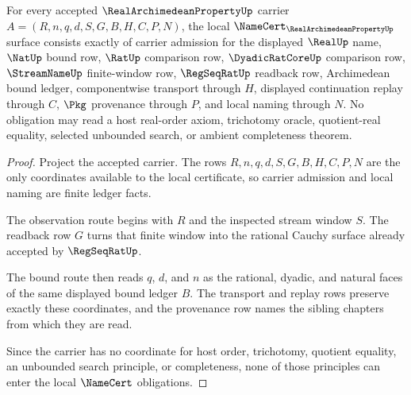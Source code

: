\begin{theorem}
\label{thm:real-archimedean-property-namecert-obligations}
For every accepted $\RealArchimedeanPropertyUp$ carrier $A=(R,n,q,d,S,G,B,H,C,P,N)$, the local $\NameCert_{\RealArchimedeanPropertyUp}$ surface consists exactly of carrier admission for the displayed $\RealUp$ name, $\NatUp$ bound row, $\RatUp$ comparison row, $\DyadicRatCoreUp$ comparison row, $\StreamNameUp$ finite-window row, $\RegSeqRatUp$ readback row, Archimedean bound ledger, componentwise transport through $H$, displayed continuation replay through $C$, $\Pkg$ provenance through $P$, and local naming through $N$. No obligation may read a host real-order axiom, trichotomy oracle, quotient-real equality, selected unbounded search, or ambient completeness theorem.
\end{theorem}
\begin{proof}
Project the accepted carrier. The rows $R,n,q,d,S,G,B,H,C,P,N$ are the only coordinates available to the local certificate, so carrier admission and local naming are finite ledger facts.

The observation route begins with $R$ and the inspected stream window $S$. The readback row $G$ turns that finite window into the rational Cauchy surface already accepted by $\RegSeqRatUp$.

The bound route then reads $q$, $d$, and $n$ as the rational, dyadic, and natural faces of the same displayed bound ledger $B$. The transport and replay rows preserve exactly these coordinates, and the provenance row names the sibling chapters from which they are read.

Since the carrier has no coordinate for host order, trichotomy, quotient equality, an unbounded search principle, or completeness, none of those principles can enter the local $\NameCert$ obligations.
\end{proof}

